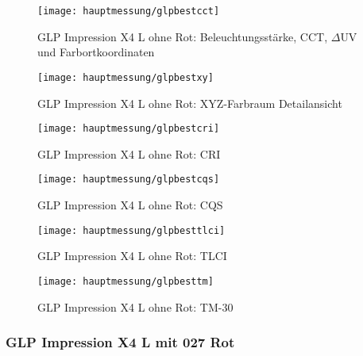 \documentclass[pagesize,paper=A4,fontsize=12pt,utf8,numbers=noenddot,bibliography=totoc,listof=totoc,DIV=11,BCOR=1mm]{scrreprt}
\begin{document}
\begin{figure}[htp]     %
\centering
\texttt{[image: hauptmessung/glpbestcct]} 
\caption {GLP Impression X4 L ohne Rot: Beleuchtungsstärke, CCT, $\Delta$UV und Farbortkoordinaten} 
\end{figure}

\begin{figure}[htp]     %
\centering
\texttt{[image: hauptmessung/glpbestxy]} 
\caption {GLP Impression X4 L ohne Rot: XYZ-Farbraum Detailansicht} 
\end{figure}

\begin{figure}[htp]     %
\centering
\texttt{[image: hauptmessung/glpbestcri]} 
\caption {GLP Impression X4 L ohne Rot: CRI} 
\end{figure}

\begin{figure}[htp]     %
\centering
\texttt{[image: hauptmessung/glpbestcqs]} 
\caption {GLP Impression X4 L ohne Rot: CQS} 
\end{figure}

\begin{figure}[htp]     %
\centering
\texttt{[image: hauptmessung/glpbesttlci]} 
\caption {GLP Impression X4 L ohne Rot: TLCI} 
\end{figure}

\begin{figure}[htp]     %
\centering
\texttt{[image: hauptmessung/glpbesttm]} 
\caption {GLP Impression X4 L ohne Rot: TM-30} 
\end{figure}

\subsubsection{GLP Impression X4 L mit 027 Rot}
\end{document}
